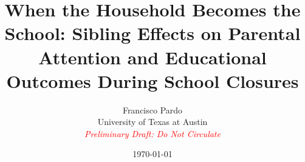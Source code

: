 
\title{When the Household Becomes the School: Sibling Effects on Parental Attention and Educational Outcomes During School Closures} %
\author{
	Francisco Pardo \\
    University of Texas at Austin \\
    \textit{\textcolor{red}{Preliminary Draft: Do Not Circulate}}
}
\date{\today}
\JEL{}
\Keywords{}